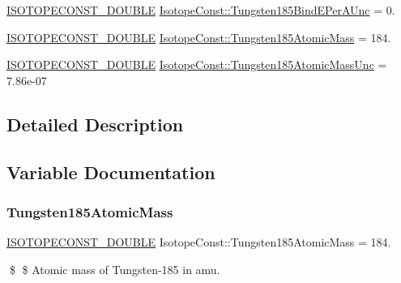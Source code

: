 \begin{DoxyCompactItemize}
\mbox{\hyperlink{group___isotope_const-_macros_ga8f45a7272ce02c0b4c65c44636ed719a}{I\+S\+O\+T\+O\+P\+E\+C\+O\+N\+S\+T\+\_\+\+D\+O\+U\+B\+LE}} \mbox{\hyperlink{group___isotope_const-_tungsten-_w185_ga7d9af1209655de303d5a43bd517b5655}{Isotope\+Const\+::\+Tungsten185\+Bind\+E\+Per\+A\+Unc}} = 0.
\item 
\mbox{\hyperlink{group___isotope_const-_macros_ga8f45a7272ce02c0b4c65c44636ed719a}{I\+S\+O\+T\+O\+P\+E\+C\+O\+N\+S\+T\+\_\+\+D\+O\+U\+B\+LE}} \mbox{\hyperlink{group___isotope_const-_tungsten-_w185_ga4d4d0a11eb9793b0f9e2787b0b27637a}{Isotope\+Const\+::\+Tungsten185\+Atomic\+Mass}} = 184.
\item 
\mbox{\hyperlink{group___isotope_const-_macros_ga8f45a7272ce02c0b4c65c44636ed719a}{I\+S\+O\+T\+O\+P\+E\+C\+O\+N\+S\+T\+\_\+\+D\+O\+U\+B\+LE}} \mbox{\hyperlink{group___isotope_const-_tungsten-_w185_ga7479a564df06c63d02e6c808ca03f766}{Isotope\+Const\+::\+Tungsten185\+Atomic\+Mass\+Unc}} = 7.\+86e-\/07
\end{DoxyCompactItemize}


\subsection{Detailed Description}


\subsection{Variable Documentation}
\mbox{\label{group___isotope_const-_tungsten-_w185_ga4d4d0a11eb9793b0f9e2787b0b27637a}} 
\subsubsection{\texorpdfstring{Tungsten185\+Atomic\+Mass}{Tungsten185AtomicMass}}
{\footnotesize\ttfamily \mbox{\hyperlink{group___isotope_const-_macros_ga8f45a7272ce02c0b4c65c44636ed719a}{I\+S\+O\+T\+O\+P\+E\+C\+O\+N\+S\+T\+\_\+\+D\+O\+U\+B\+LE}} Isotope\+Const\+::\+Tungsten185\+Atomic\+Mass = 184.}

\$ \$ Atomic mass of Tungsten-\/185 in amu. \mbox{\label{group___isotope_const-_tungsten-_w185_ga7479a564df06c63d02e6c808ca03f766}} 
